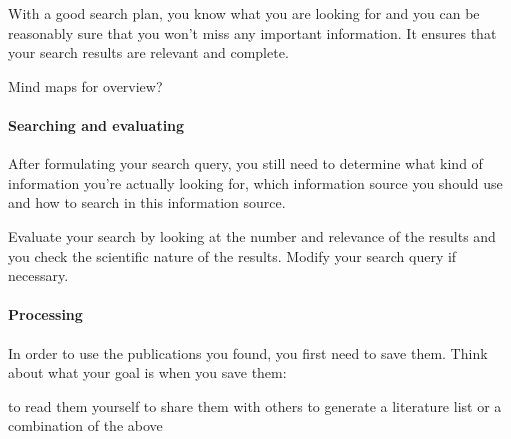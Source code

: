 \documentclass[11pt]{report}
\begin{document}
With a good search plan, you know what you are looking for and you can be reasonably sure that you won't miss any important information. It ensures that your search results are relevant and complete.


Mind maps for overview?


\paragraph{Searching and evaluating}
After formulating your search query, you still need to determine what kind of information you're actually looking for, which information source you should use and how to search in this information source.
	
Evaluate your search by looking at the number and relevance of the results and you check the scientific nature of the results. Modify your search query if necessary.
\paragraph{Processing}
In order to use the publications you found, you first need to save them. Think about what your goal is when you save them:

to read them yourself
to share them with others
to generate a literature list
or a combination of the above
\end{document}
